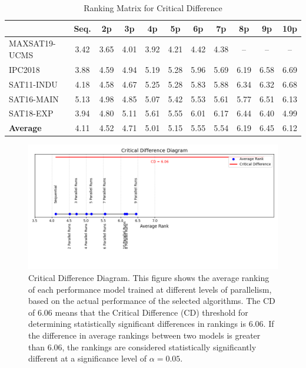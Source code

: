 \begin{table}[ht]
\centering
\caption{Ranking Matrix for Critical Difference}\label{tab:rank_mat}
\small
\setlength{\tabcolsep}{4pt} %
\renewcommand{\arraystretch}{1.1} %
\begin{tabular}{lcccccccccc}
  \hline
 & \textbf{Seq.} & \textbf{2p} & \textbf{3p} & \textbf{4p} & \textbf{5p} & \textbf{6p} & \textbf{7p} & \textbf{8p} & \textbf{9p} & \textbf{10p} \\ 
  \hline
MAXSAT19-UCMS & 3.42 & 3.65 & 4.01 & 3.92 & 4.21 & 4.42 & 4.38 & -- & -- & -- \\ 
IPC2018 & 3.88 & 4.59 & 4.94 & 5.19 & 5.28 & 5.96 & 5.69 & 6.19 & 6.58 & 6.69 \\ 
SAT11-INDU & 4.18 & 4.58 & 4.67 & 5.25 & 5.28 & 5.83 & 5.88 & 6.34 & 6.32 & 6.68 \\ 
SAT16-MAIN & 5.13 & 4.98 & 4.85 & 5.07 & 5.42 & 5.53 & 5.61 & 5.77 & 6.51 & 6.13 \\ 
SAT18-EXP & 3.94 & 4.80 & 5.11 & 5.61 & 5.55 & 6.01 & 6.17 & 6.44 & 6.40 & 4.99 \\ 
\hline
\textbf{Average} & 4.11 & 4.52 & 4.71 & 5.01 & 5.15 & 5.55 & 5.54 & 6.19 & 6.45 & 6.12 \\   
\hline
\end{tabular}
\end{table}

\begin{figure}
        \includegraphics[width=.8\linewidth]{plots/Alternating_Label_Critical_Difference_Diagram.png}
    \caption[Critical Difference Diagram: Rankings of Performance Models Trained on Sequential vs. Parallel Data]{Critical Difference Diagram. This figure shows the average ranking of each performance model trained at different levels of parallelism, based on the actual performance of the selected algorithms. The CD of 6.06 means that the Critical Difference (CD) threshold for determining statistically significant differences in rankings is 6.06. If the difference in average rankings between two models is greater than 6.06, the rankings are considered statistically significantly different at a significance level of $\alpha=0.05$.}
    \label{fig:critical}
\end{figure}

